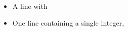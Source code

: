 



\Input
\begin{itemize}
 \item A line with 
\end{itemize}

\Output
\begin{itemize}
 \item One line containing a single integer, 
\end{itemize}

\Example
